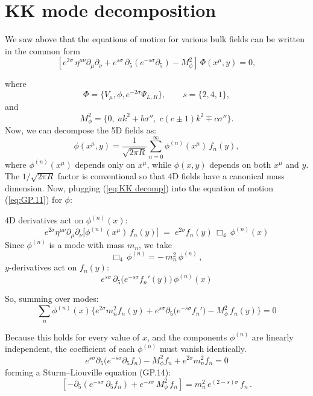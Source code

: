 \documentclass[11pt]{article}
\begin{document}
\section{KK mode decomposition}

We saw above that the equations of motion for various bulk fields can be written in the common form
\begin{equation}
\left[
e^{2\sigma}\,\eta^{\mu\nu}\partial_\mu \partial_\nu
+ e^{s\sigma}\,\partial_5\!\left(e^{-s\sigma}\partial_5\right)
- M_\phi^2
\right]\,
\Phi(x^\mu,y)=0 ,
\label{eq:GP.11}
\end{equation}

where
\[
\Phi=\{V_\mu,\phi,e^{-2\sigma}\Psi_{L,R}\},
\qquad
s=\{2,4,1\},
\]
and
\[
M_\phi^2=\{0,\; a k^2 + b\sigma'',\; c(c\pm1)k^2 \mp c\sigma''\}.
\]
Now, we can decompose the 5D fields as:
\begin{equation}
\phi(x^\mu,y)=\frac{1}{\sqrt{2\pi R}}\sum_{n=0}^{\infty}\phi^{(n)}(x^\mu)\,f_n(y),
\label{eq:KK decomp}
\end{equation}
where $\phi^{(n)}(x^\mu)$ depends only on $x^\mu$, while $\phi(x,y)$ depends on both $x^\mu$ and $y$. The $1/\sqrt{2\pi R}$ factor is conventional so that 4D fields have a canonical mass dimension. Now, plugging (\ref{eq:KK decomp}) into the equation of motion (\ref{eq:GP.11}) for $\phi$:

4D derivatives act on $\phi^{(n)}(x)$:
\[
e^{2\sigma}\eta^{\mu\nu}\partial_\mu\partial_\nu\Big[\phi^{(n)}(x^\mu)\,f_n(y)\Big]
\;=\;
e^{2\sigma}f_n(y)\,\Box_4\,\phi^{(n)}(x)
\]
Since $\phi^{(n)}$ is a mode with mass $m_n$, we take
\[
\Box_4\,\phi^{(n)} = -\,m_n^2\,\phi^{(n)}\,,
\]
$y$-derivatives act on $f_n(y)$:
\[
e^{s\sigma}\,\partial_5\!\Big(e^{-s\sigma} f_n'(y)\Big)\,\phi^{(n)}(x)
\]

So, summing over modes:
\[
\sum_n \phi^{(n)}(x)
\Big\{
e^{2\sigma} m_n^2 f_n(y)
+
e^{s\sigma}\partial_5\!\big(e^{-s\sigma}f_n'\big)
-
M_{\phi}^2\,f_n(y)
\Big\}
=0
\]

Because this holds for every value of $x$, and the components $\phi^{(n)}$ are linearly independent, the coefficient of each $\phi^{(n)}$ must vanish identically.
\[
e^{s\sigma}\partial_5\!\big(e^{-s\sigma}\partial_5 f_n\big) - M_\phi^2 f_n + e^{2\sigma} m_n^2 f_n = 0
\]
forming a Sturm--Liouville equation (GP.14):
\begin{equation}
\label{eq:SL}
\left[-\partial_5\!\left(e^{-s\sigma}\,\partial_5 f_n\right) + e^{-s\sigma}\,M_\phi^2\,f_n\right]
= m_n^2\,e^{(2-s)\sigma}\,f_n\,.
\end{equation}
\end{document}
